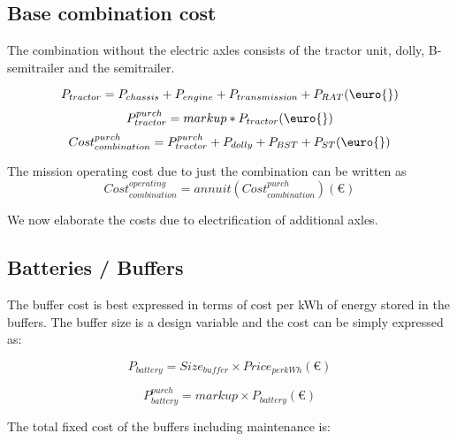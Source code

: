 \documentclass[ExampleMasters.tex]{subfiles}
\begin{document}
		\subsection{Base combination cost}

			The combination without the electric axles consists of the tractor unit, dolly, B-semitrailer and the semitrailer. 

			\begin{equation}
				P_{tractor} = P_{chassis}+P_{engine}+P_{transmission}+P_{RAT}  (\euro{})\\
			\end{equation}
			\begin{equation}
				P_{tractor}^{purch}= markup*P_{tractor} (\euro{})\\
			\end{equation}
			\begin{equation}
				Cost_{combination}^{purch} = P_{tractor}^{purch}+P_{dolly}+P_{BST}+P_{ST} (\euro{})\\
			\end{equation}

			The mission operating cost due to just the combination can be written as 
			\begin{equation}
				Cost_{combination}^{operating} = annuit(Cost_{combination}^{purch}) (\euro{})
			\end{equation}

			\par
			We now elaborate the costs due to electrification of additional axles.

		\subsection{Batteries / Buffers}

			The buffer cost is best expressed in terms of cost per kWh of energy stored in the buffers. The buffer size is a design variable and the cost can be simply expressed as:

			\begin{equation}
				P_{battery}= Size_{buffer} \times Price_{perkWh} (\euro{})
			\end{equation}

			\begin{equation} 
				P^{purch}_{battery} = markup \times P_{battery} (\euro{})
			\end{equation}

			The total fixed cost of the buffers including maintenance is:
\end{document}
